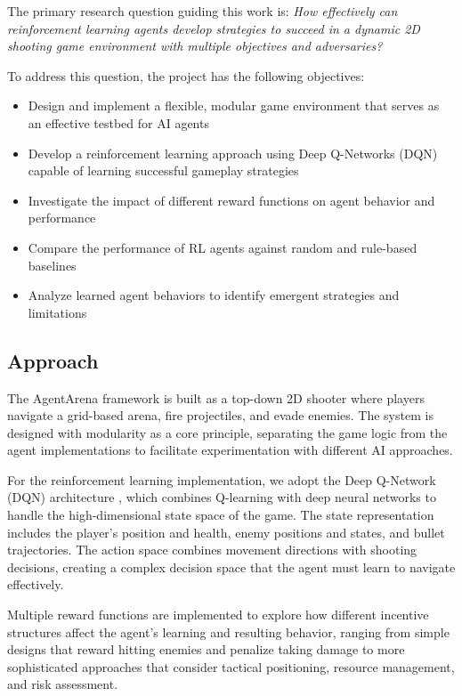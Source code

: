 The primary research question guiding this work is: \textit{How effectively can reinforcement learning agents develop strategies to succeed in a dynamic 2D shooting game environment with multiple objectives and adversaries?}

To address this question, the project has the following objectives:

\begin{itemize}
    \item Design and implement a flexible, modular game environment that serves as an effective testbed for AI agents
    \item Develop a reinforcement learning approach using Deep Q-Networks (DQN) capable of learning successful gameplay strategies
    \item Investigate the impact of different reward functions on agent behavior and performance
    \item Compare the performance of RL agents against random and rule-based baselines
    \item Analyze learned agent behaviors to identify emergent strategies and limitations
\end{itemize}

\subsection{Approach}

The AgentArena framework is built as a top-down 2D shooter where players navigate a grid-based arena, fire projectiles, and evade enemies. The system is designed with modularity as a core principle, separating the game logic from the agent implementations to facilitate experimentation with different AI approaches.

For the reinforcement learning implementation, we adopt the Deep Q-Network (DQN) architecture \cite{mnih2015human}, which combines Q-learning with deep neural networks to handle the high-dimensional state space of the game. The state representation includes the player's position and health, enemy positions and states, and bullet trajectories. The action space combines movement directions with shooting decisions, creating a complex decision space that the agent must learn to navigate effectively.

Multiple reward functions are implemented to explore how different incentive structures affect the agent's learning and resulting behavior, ranging from simple designs that reward hitting enemies and penalize taking damage to more sophisticated approaches that consider tactical positioning, resource management, and risk assessment.

